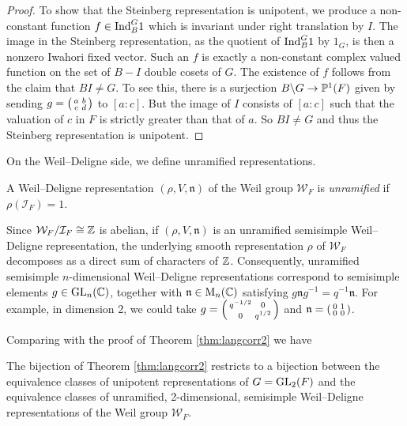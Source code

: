 \begin{proof}
    To show that the Steinberg representation is unipotent, we produce a non-constant function $f \in \mathrm{Ind}_B^G 1$ which is invariant under right translation by $I$. The image in the Steinberg representation, as the quotient of $\mathrm{Ind}_B^G 1$ by $1_G$, is then a nonzero Iwahori fixed vector. Such an $f$ is exactly a non-constant complex valued function on the set of $B-I$ double cosets of $G$. The existence of $f$ follows from the claim that $BI \neq G$. To see this, there is a surjection $B \backslash G \to \mathbb{P}^1(F)$ given by sending $g=\begin{psmallmatrix}
        a&b\\c&d
    \end{psmallmatrix}$ to $[a:c]$. But the image of $I$ consists of $[a:c]$ such that the valuation of $c$ in $F$ is strictly greater than that of $a$. So $BI \neq G$ and thus the Steinberg representation is unipotent. 
\end{proof}

On the Weil--Deligne side, we define unramified representations.

\begin{defn}
    A Weil--Deligne representation $(\rho, V, \mathfrak n)$ of the Weil group $\mathcal W_F$ is \textit{unramified} if $\rho(\mathcal I_F)=1$.
\end{defn}
\begin{rem}
    Since $\mathcal W_F/\mathcal I_F \cong \mathbb{Z}$ is abelian, if $(\rho,V,\mathfrak n)$ is an unramified semisimple Weil--Deligne representation, the underlying smooth representation $\rho$ of $\mathcal W_F$ decomposes as a direct sum of characters of $\mathbb{Z}$. Consequently, unramified semisimple $n$-dimensional Weil--Deligne representations correspond to semisimple elements $g \in \mathrm{GL}_n(\mathbb{C})$, together with $\mathfrak n \in \mathrm{M}_n(\mathbb{C})$ satisfying $g \mathfrak n g^{-1} = q^{-1}\mathfrak n$. For example, in dimension 2, we could take $g=\begin{psmallmatrix}
        q^{-1/2} &0\\0&q^{1/2}
    \end{psmallmatrix} $ and $\mathfrak n = \begin{psmallmatrix}
        0&1\\0&0
    \end{psmallmatrix}$.
\end{rem}

Comparing with the proof of Theorem \ref{thm:langcorr2} we have

\begin{cor}\label{cor:unipotentcorr}
    The bijection of Theorem \ref{thm:langcorr2} restricts to a bijection between the equivalence classes of unipotent representations of $G=\mathrm{GL}_2(F)$ and the equivalence classes of unramified, 2-dimensional, semisimple Weil--Deligne representations of the Weil group $\mathcal W_F$.    
\end{cor}


